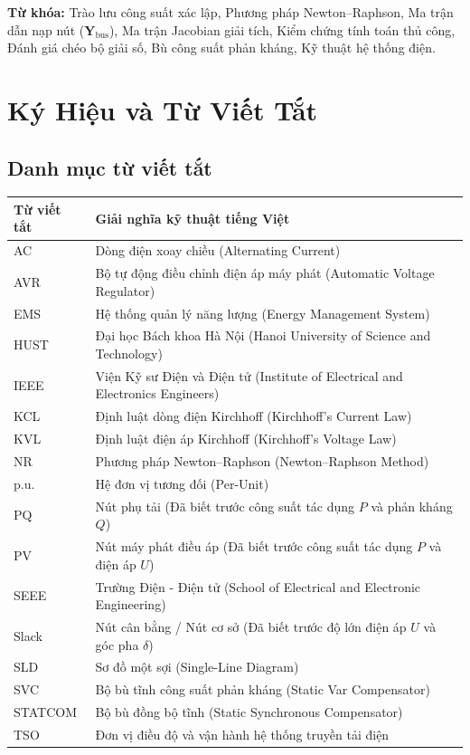 \documentclass[12pt,a4paper,oneside]{report}
\begin{document}
\vspace{15pt}
\noindent \textbf{Từ khóa:} Trào lưu công suất xác lập, Phương pháp Newton--Raphson, Ma trận dẫn nạp nút ($\mathbf{Y}_{\text{bus}}$), Ma trận Jacobian giải tích, Kiểm chứng tính toán thủ công, Đánh giá chéo bộ giải số, Bù công suất phản kháng, Kỹ thuật hệ thống điện.

\clearpage

\chapter*{Ký Hiệu và Từ Viết Tắt}

\section*{Danh mục từ viết tắt}
\begin{longtable}{p{2.5cm}p{12.0cm}}
\toprule
\textbf{Từ viết tắt} & \textbf{Giải nghĩa kỹ thuật tiếng Việt} \\
\midrule
AC & Dòng điện xoay chiều (Alternating Current) \\
AVR & Bộ tự động điều chỉnh điện áp máy phát (Automatic Voltage Regulator) \\
EMS & Hệ thống quản lý năng lượng (Energy Management System) \\
HUST & Đại học Bách khoa Hà Nội (Hanoi University of Science and Technology) \\
IEEE & Viện Kỹ sư Điện và Điện tử (Institute of Electrical and Electronics Engineers) \\
KCL & Định luật dòng điện Kirchhoff (Kirchhoff's Current Law) \\
KVL & Định luật điện áp Kirchhoff (Kirchhoff's Voltage Law) \\
NR & Phương pháp Newton--Raphson (Newton--Raphson Method) \\
p.u. & Hệ đơn vị tương đối (Per-Unit) \\
PQ & Nút phụ tải (Đã biết trước công suất tác dụng $P$ và phản kháng $Q$) \\
PV & Nút máy phát điều áp (Đã biết trước công suất tác dụng $P$ và điện áp $U$) \\
SEEE & Trường Điện - Điện tử (School of Electrical and Electronic Engineering) \\
Slack & Nút cân bằng / Nút cơ sở (Đã biết trước độ lớn điện áp $U$ và góc pha $\delta$) \\
SLD & Sơ đồ một sợi (Single-Line Diagram) \\
SVC & Bộ bù tĩnh công suất phản kháng (Static Var Compensator) \\
STATCOM & Bộ bù đồng bộ tĩnh (Static Synchronous Compensator) \\
TSO & Đơn vị điều độ và vận hành hệ thống truyền tải điện \\
\bottomrule
\end{longtable}
\end{document}
